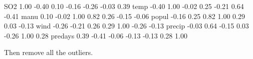\documentclass[
]{article}
\newenvironment{Shaded}{\begin{snugshade}}{\end{snugshade}}
\newcommand{\FloatTok}[1]{\textcolor[rgb]{0.00,0.00,0.81}{#1}}
\newcommand{\NormalTok}[1]{#1}
\newcommand{\SpecialCharTok}[1]{\textcolor[rgb]{0.00,0.00,0.00}{#1}}
\begin{document}
\begin{Shaded}
\begin{Highlighting}[]
\NormalTok{SO2      }\FloatTok{1.00} \SpecialCharTok{{-}}\FloatTok{0.40}  \FloatTok{0.10} \SpecialCharTok{{-}}\FloatTok{0.16} \SpecialCharTok{{-}}\FloatTok{0.26}  \SpecialCharTok{{-}}\FloatTok{0.03}    \FloatTok{0.39}
\NormalTok{temp    }\SpecialCharTok{{-}}\FloatTok{0.40}  \FloatTok{1.00} \SpecialCharTok{{-}}\FloatTok{0.02}  \FloatTok{0.25} \SpecialCharTok{{-}}\FloatTok{0.21}   \FloatTok{0.64}   \SpecialCharTok{{-}}\FloatTok{0.41}
\NormalTok{manu     }\FloatTok{0.10} \SpecialCharTok{{-}}\FloatTok{0.02}  \FloatTok{1.00}  \FloatTok{0.82}  \FloatTok{0.26}  \SpecialCharTok{{-}}\FloatTok{0.15}   \SpecialCharTok{{-}}\FloatTok{0.06}
\NormalTok{popul   }\SpecialCharTok{{-}}\FloatTok{0.16}  \FloatTok{0.25}  \FloatTok{0.82}  \FloatTok{1.00}  \FloatTok{0.29}   \FloatTok{0.03}   \SpecialCharTok{{-}}\FloatTok{0.13}
\NormalTok{wind    }\SpecialCharTok{{-}}\FloatTok{0.26} \SpecialCharTok{{-}}\FloatTok{0.21}  \FloatTok{0.26}  \FloatTok{0.29}  \FloatTok{1.00}  \SpecialCharTok{{-}}\FloatTok{0.26}   \SpecialCharTok{{-}}\FloatTok{0.13}
\NormalTok{precip  }\SpecialCharTok{{-}}\FloatTok{0.03}  \FloatTok{0.64} \SpecialCharTok{{-}}\FloatTok{0.15}  \FloatTok{0.03} \SpecialCharTok{{-}}\FloatTok{0.26}   \FloatTok{1.00}    \FloatTok{0.28}
\NormalTok{predays  }\FloatTok{0.39} \SpecialCharTok{{-}}\FloatTok{0.41} \SpecialCharTok{{-}}\FloatTok{0.06} \SpecialCharTok{{-}}\FloatTok{0.13} \SpecialCharTok{{-}}\FloatTok{0.13}   \FloatTok{0.28}    \FloatTok{1.00}
\end{Highlighting}
\end{Shaded}

Then remove all the outliers.
\end{document}
